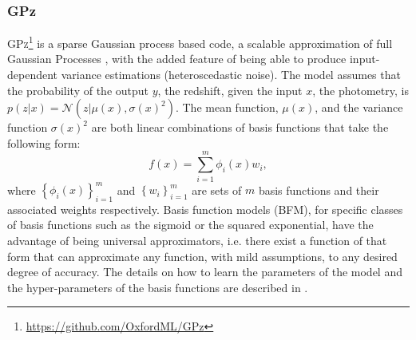 


%
%

\subsubsection{GPz}
\label{sec:gpz}

\textsc{GPz}\footnote{\url{https://github.com/OxfordML/GPz}} \citep{Almosallam:16a,Almosallam:15b} is a sparse Gaussian process based code, a scalable approximation of full Gaussian Processes \citep{Rasmussen:06}, with the added feature of being able to produce input-dependent variance estimations (heteroscedastic noise).
The model assumes that the probability of the output $y$, the redshift, given the input $x$, the photometry, is $p(z|x)=\mathcal{N}\left(z|\mu(x),\sigma(x)^{2}\right)$. The mean function, $\mu(x)$, and the variance function $\sigma(x)^{2}$ are both linear combinations of basis functions that take the following form:
\begin{equation}
f(x)=\sum_{i=1}^{m}\phi_{i}(x)w_{i},
\end{equation}
where $\left\{\phi_{i}(x)\right\}_{i=1}^{m}$ and $\left\{w_{i}\right\}_{i=1}^{m}$ are sets of $m$ basis functions and their associated weights respectively.
Basis function models (BFM), for specific classes of basis functions such as the sigmoid or the squared exponential, have the advantage of being universal approximators, i.e. there exist a function of that form that can approximate any function, with mild assumptions, to any desired degree of accuracy.
The details on how to learn the parameters of the model and the hyper-parameters of the basis functions are described in \citet{Almosallam:15b}.

